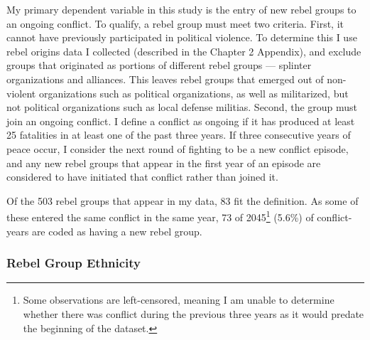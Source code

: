 \documentclass[12pt,]{book}
\let\rmarkdownfootnote\footnote%
\def\footnote{\protect\rmarkdownfootnote}
\theoremstyle{definition}
\theoremstyle{definition}
\theoremstyle{remark}
\begin{document}
My primary dependent variable in this study is the entry of new rebel
groups to an ongoing conflict. To qualify, a rebel group must meet two
criteria. First, it cannot have previously participated in political
violence. To determine this I use rebel origins data I collected
(described in the Chapter 2 Appendix), and exclude groups that
originated as portions of different rebel groups --- splinter
organizations and alliances. This leaves rebel groups that emerged out
of non-violent organizations such as political organizations, as well as
militarized, but not political organizations such as local defense
militias. Second, the group must join an ongoing conflict. I define a
conflict as ongoing if it has produced at least 25 fatalities in at
least one of the past three years. If three consecutive years of peace
occur, I consider the next round of fighting to be a new conflict
episode, and any new rebel groups that appear in the first year of an
episode are considered to have initiated that conflict rather than
joined it.

Of the 503 rebel groups that appear in my data, 83 fit the definition.
As some of these entered the same conflict in the same year, 73 of
2045\footnote{Some observations are left-censored, meaning I am unable
  to determine whether there was conflict during the previous three
  years as it would predate the beginning of the dataset.} (5.6\%) of
conflict-years are coded as having a new rebel group.

\subsubsection*{Rebel Group Ethnicity}\label{rebel-group-ethnicity}
\end{document}
